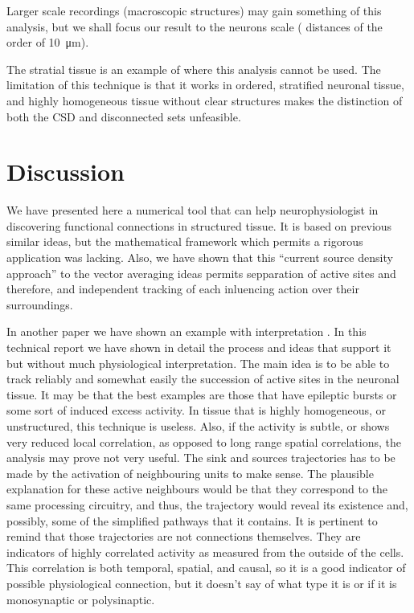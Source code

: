 \documentclass[utf8]{frontiersSCNS}
\newcommand{\mum}[1]{\SI{#1}{\micro\metre}}
\begin{document}
 Larger scale recordings (macroscopic
structures) may gain something of this analysis, but we shall focus
our result to the neurons scale ( distances of the order of \mum{10}).

The stratial tissue is an example of where this analysis cannot be used.
The limitation of this technique is that it works  in
ordered, stratified neuronal tissue, and highly homogeneous tissue
without clear structures makes the distinction of both the CSD and
disconnected sets unfeasible.



\section{Discussion}

We have presented here a numerical tool that can help neurophysiologist in
discovering functional connections in structured tissue.
It is based on previous similar ideas, but the mathematical framework
which permits a rigorous application was lacking. Also, we have
shown that this ``current source density approach'' to the vector
averaging ideas permits sepparation of active sites and therefore,
and independent tracking of each inluencing action over
their surroundings.

In another paper 
we have shown an example with interpretation \citep{Franco2018}.
In this technical report we have shown in detail the process and ideas
that support it but without much physiological interpretation.
The main idea is to be able to track reliably and somewhat easily
the succession of active sites in the neuronal tissue. It may be that the best
examples are those that have epileptic bursts or some
sort of induced excess activity. In tissue that is highly homogeneous,
or unstructured, this technique is useless. Also, if the activity is
subtle, or shows very reduced local correlation, as opposed to long
range spatial correlations, the analysis may prove not very useful.
The sink and sources trajectories has to be made by the activation
of neighbouring units to make sense. The plausible explanation for these
active neighbours would be that they correspond to the same processing
circuitry, and thus, the trajectory would reveal its existence and,
possibly, some of the simplified pathways that it contains.
It is pertinent to remind that those trajectories are not
connections themselves. They are indicators of highly correlated
activity as measured from the outside of the cells. This correlation is
both temporal, spatial, and causal, so it is a good indicator
of possible physiological connection, but it doesn't say of what type it
is or if it is monosynaptic or polysinaptic.
\end{document}
